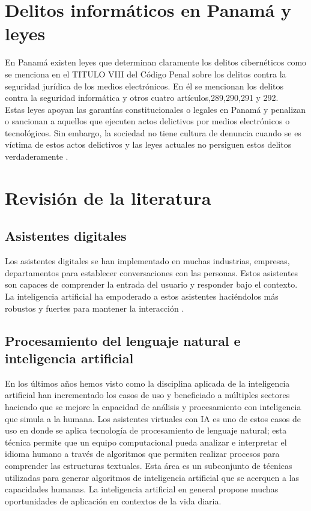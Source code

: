 \section{ Delitos informáticos en Panamá y leyes}\label{section:Delitos informáticos en Panamá y leyes}
En Panamá existen leyes que determinan claramente los delitos cibernéticos como se menciona en el TITULO VIII del Código Penal sobre los delitos contra la seguridad jurídica de los medios electrónicos. En él se mencionan los delitos contra la seguridad informática y otros cuatro artículos,289,290,291 y 292. \\
Estas leyes apoyan las garantías constitucionales o legales en Panamá y penalizan o sancionan a aquellos que ejecuten actos delictivos por medios electrónicos o tecnológicos. Sin embargo, la sociedad no tiene cultura de denuncia cuando se es víctima de estos actos delictivos y las leyes actuales no persiguen estos delitos verdaderamente \cite{Francis2022}.

\section{Revisión de la literatura}\label{section: Revisión de la literatura}
\subsection{Asistentes digitales}
Los asistentes digitales se han implementado en muchas industrias, empresas, departamentos para establecer conversaciones con las personas. Estos asistentes son capaces de comprender la entrada del usuario y responder bajo el contexto. La inteligencia artificial ha empoderado a estos asistentes haciéndolos más robustos y fuertes para mantener la interacción \cite{Urribarri2022}.
\subsection{Procesamiento del lenguaje natural e inteligencia artificial}\label{section: Revisión de la literatura}
En los últimos años hemos visto como la disciplina aplicada de la inteligencia artificial han incrementado los casos de uso y beneficiado a múltiples sectores haciendo que se mejore la capacidad de análisis y procesamiento con inteligencia que simula a la humana. Los asistentes virtuales con IA es uno de estos casos de uso en donde se aplica tecnología de procesamiento de lenguaje natural; esta técnica permite que un equipo computacional pueda analizar e interpretar el idioma humano a través de algoritmos que permiten realizar procesos para comprender las estructuras textuales. Esta área es un subconjunto de técnicas utilizadas para generar algoritmos de inteligencia artificial que se acerquen a las capacidades humanas. La inteligencia artificial en general propone muchas oportunidades de aplicación en contextos de la vida diaria.
